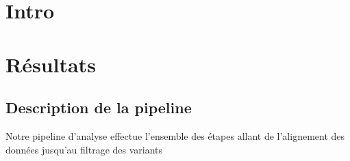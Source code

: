 \documentclass[12pt,twoside]{reedthesis}
\theoremstyle{definition}
\theoremstyle{definition}
\theoremstyle{remark}
\begin{document}
  \section{Intro}\label{intro}
  
  \newpage
  
  \section{Résultats}\label{resultats}
  
  \subsection{Description de la
  pipeline}\label{description-de-la-pipeline}
  
  Notre pipeline d'analyse effectue l'ensemble des étapes allant de
  l'alignement des données jusqu'au filtrage des variants
  
\end{document}
